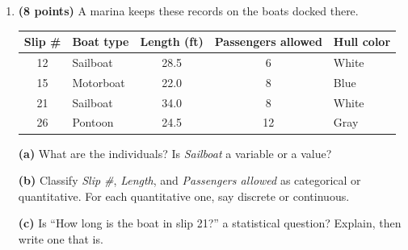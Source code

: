 \documentclass[12pt]{article}
\begin{document}
\vspace{0.06in}

\begin{enumerate}[leftmargin=1.9em, itemsep=0.10in, resume]

  \boxguard[22]
  \item \textbf{(8 points)} A marina keeps these records on the boats docked there.

        \vspace{3pt}
        {\centering\small
        \renewcommand{\arraystretch}{1.05}
        \begin{tabular}{@{} c l c c l @{}}
        \textbf{Slip \#} & \textbf{Boat type} & \textbf{Length (ft)} & \textbf{Passengers allowed} &
        \textbf{Hull color} \\ \hline
        12 & Sailboat  & 28.5 & 6  & White \\
        15 & Motorboat & 22.0 & 8  & Blue \\
        21 & Sailboat  & 34.0 & 8  & White \\
        26 & Pontoon   & 24.5 & 12 & Gray \\
        \end{tabular}\par}

        \vspace{3pt}
        \textbf{(a)} What are the individuals? Is \emph{Sailboat} a variable or a value?\\[2pt]

        \boxguard[15]
        \vspace{3pt}
        \textbf{(b)} Classify \emph{Slip \#}, \emph{Length}, and \emph{Passengers allowed} as
        categorical or quantitative. For each quantitative one, say discrete or continuous.\\[2pt]

        \boxguard[15]
        \vspace{3pt}
        \textbf{(c)} Is ``How long is the boat in slip 21?'' a statistical question? Explain, then
        write one that is.\\[2pt]


\end{enumerate}
\end{document}
